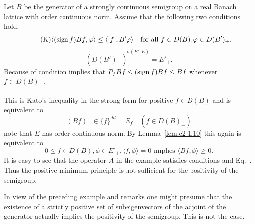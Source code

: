\begin{remark}\label{rem:c2-3.16}
Let $B$ be the generator of a strongly continuous semigroup on a real Banach lattice with order continuous norm. Assume that the following two conditions hold.
\begin{equation} \label{eq:c2-3.17-K} \tag{K}
\langle(\sign  f)Bf,\phi\rangle \leq \langle|f|,B'\phi\rangle \quad\text{for all } f \in D(B),  \phi \in D(B')_{+} .
\end{equation}
\begin{equation}
\overline{(D(B')_{+})}^{\sigma(E',E)} = E'_{+}. \label{eq:c2-3.17}
\end{equation}
Because of  condition  implies that $P_{f}Bf \leq (\sign  f)Bf \leq Bf$
whenever $f \in D(B)_{+}$.

This is Kato's inequality in the strong form for positive $f \in D(B)$ and is equivalent to 
\[
(Bf)^{-} \in \{f\}^{dd} = \overline{E_f} \quad (f \in D(B)_{+})
\]
note that $E$ has order continuous norm. By Lemma~\ref{lem:c2-1.10}  this again is equivalent to
\begin{equation}\label{eq:c2-P2} \tag{P}
0 \leq f \in D(B),  \phi \in E'_{+},  \langle f,\phi \rangle = 0 \text{ implies } \langle Bf,\phi \rangle \geq 0.
\end{equation}
It is easy to see that the operator $A$ in the example satisfies conditions   and Eq.~. Thus the positive minimum principle  is not sufficient for the positivity of the semigroup.
\end{remark}
In view of the preceding example and remarks one might presume that the existence of a strictly positive set of subeigenvectors of the adjoint of the generator actually implies the positivity of the semigroup. 
This is not the case.

